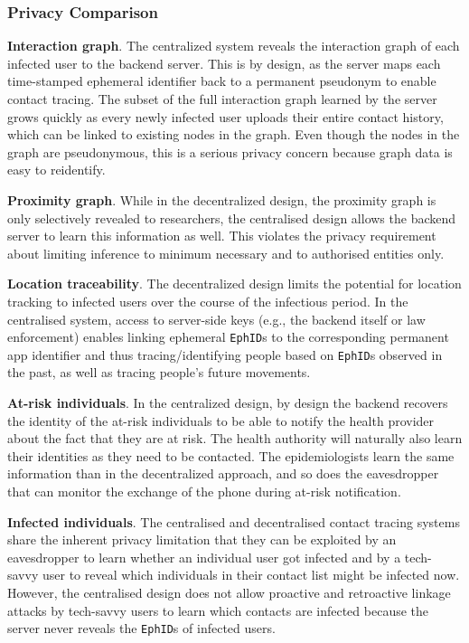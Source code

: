 \documentclass[12pt,a4paper]{article}
\begin{document}
\subsubsection*{Privacy Comparison}
\textbf{Interaction graph}. The centralized system reveals the interaction graph of each infected user to the backend server. This is by design, as the server maps each time-stamped ephemeral identifier back to a permanent pseudonym to enable contact tracing. The subset of the full interaction graph learned by the server grows quickly as every newly infected user uploads their entire contact history, which can be linked to existing nodes in the graph. Even though the nodes in the graph are pseudonymous, this is a serious privacy concern because graph data is easy to reidentify.

\textbf{Proximity graph}. While in the decentralized design, the proximity graph is only selectively revealed to researchers, the centralised design allows the backend server to learn this information as well. This violates the privacy requirement about limiting inference to minimum necessary and to authorised entities only.

\textbf{Location traceability}. The decentralized design limits the potential for location tracking to infected users over the course of the infectious period. In the centralised system, access to server-side keys (e.g., the backend itself or law enforcement) enables linking ephemeral \texttt{EphID}s to the corresponding permanent app identifier and thus tracing/identifying people based on \texttt{EphID}s  observed in the past, as well as tracing people’s future movements.

\textbf{At-risk individuals}. In the centralized design, by design the backend recovers the identity of the at-risk individuals to be able to notify the health provider about the fact that they are at risk. The health authority will naturally also learn their identities as they need to be contacted. The epidemiologists learn the same information than in the decentralized approach, and so does the eavesdropper that can monitor the exchange of the phone during at-risk notification.

\textbf{Infected individuals}. The centralised and decentralised contact tracing systems share the
inherent privacy limitation that they can be exploited by an eavesdropper to learn whether an individual user got infected and by a tech-savvy user to reveal which individuals in their contact list might be infected now. However, the centralised design does not allow proactive and retroactive linkage attacks by tech-savvy users to learn which contacts are infected because the server never reveals the \texttt{EphID}s of infected users.
\end{document}

